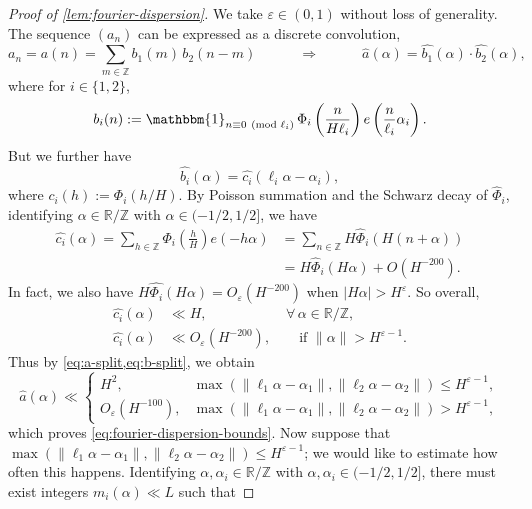\documentclass[reqno,11pt]{amsart}
\theoremstyle{remark}
\numberwithin{equation}{section}
\newcommand{\Z}{\mathbb{Z}}
\newcommand{\R}{\mathbb{R}}
\newcommand{\one}{\mathbbm{1}}
\newcommand{\eps}{\varepsilon}
\renewcommand{\hat}{\widehat}
\renewcommand{\pmod}[1]{\ (\textnormal{mod } #1)}
\begin{document}
\begin{proof}[Proof of \cref{lem:fourier-dispersion}]
We take $\eps \in (0, 1)$ without loss of generality.
The sequence $(a_n)$ can be expressed as a discrete convolution,
\begin{equation} \label{eq:a-split}
    a_n = a(n) = \sum_{m \in \Z} b_1(m)\, b_2(n-m)
    \qquad\quad 
    \Rightarrow 
    \qquad\quad 
    \hat{a}(\alpha) = \hat{b_1}(\alpha) \cdot \hat{b_2}(\alpha),
\end{equation}
where for $i \in \{1, 2\}$, 
\[
    b_i(n) := \one_{n \equiv 0 \pmod{\ell_i}}\,  \Phi_i\left(\frac{n}{H \ell_i}\right) e\left(\frac{n}{\ell_i} \alpha_i\right).
\]
But we further have
\begin{equation} \label{eq:b-split}
    \hat{b_i}(\alpha) = \hat{c_i}(\ell_i \alpha - \alpha_i),
\end{equation}
where $c_i(h) := \Phi_i(h/H)$. By Poisson summation and the Schwarz decay of $\hat{\Phi}_i$, identifying $\alpha \in \R/\Z$ with $\alpha \in (-1/2, 1/2]$, we have
\[
\begin{aligned}
    \hat{c_i}(\alpha) = \sum_{h \in \Z} \Phi_i\left(\frac{h}{H}\right) e(-h\alpha) 
    &= 
    \sum_{n \in \Z} H\hat{\Phi}_i\left(H(n + \alpha) \right)
    \\
    &=
    H\hat{\Phi}_i(H\alpha) + O\left(H^{-200}\right).
\end{aligned}
\]
In fact, we also have $H\hat{\Phi_i}(H\alpha) = O_\eps(H^{-200})$ when $|H\alpha| > H^{\eps}$. So overall,
\[
\begin{aligned}
    \hat{c_i}(\alpha) 
    &\ll H, \qquad\qquad\quad\ \ \, \forall\, \alpha \in \R/\Z,
    \\
    \hat{c_i}(\alpha) 
    &\ll
    O_\eps(H^{-200}), \qquad \text{if } \|\alpha\| > H^{\eps-1}.
\end{aligned}
\]
Thus by \cref{eq:a-split,eq:b-split}, we obtain
\begin{equation} \label{eq:a-fourier-bound}
    \hat{a}(\alpha) 
    \ll 
    \begin{cases}
        H^2, & \max\left(\|\ell_1 \alpha - \alpha_1\|, \|\ell_2 \alpha - \alpha_2\|\right) \le H^{\eps-1}, \\
        O_\eps(H^{-100}), & \max\left(\|\ell_1 \alpha - \alpha_1\|, \|\ell_2 \alpha - \alpha_2\|\right) > H^{\eps-1},
    \end{cases}
\end{equation}
which proves \cref{eq:fourier-dispersion-bounds}.
Now suppose that $\max\left(\|\ell_1 \alpha - \alpha_1\|, \|\ell_2 \alpha - \alpha_2\|\right) \le H^{\eps-1}$; we would like to estimate how often this happens. Identifying $\alpha, \alpha_i \in \R/\Z$ with $\alpha, \alpha_i \in (-1/2, 1/2]$, there must exist integers $m_i(\alpha) \ll L$ such that

\end{proof}
\end{document}
